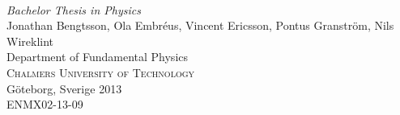 \newcommand{\backgroundpic}[3]{%
    \put(#1,#2){
        \parbox[b][\paperheight]{\paperwidth}{%
    		\centering
			\texttt{[image: \#3]}
			\vfill
}}}

\begin{titlepage}

\AddToShipoutPicture{\backgroundpic{-4}{56.7}{framsida.pdf}}
\mbox{}
\vfill
\addtolength{\voffset}{2cm}

   










\begin{flushleft}

    { \\[0.5 cm]


    \emph{\Large Bachelor Thesis in Physics} \\[0.5 cm]

    

	{\Large Jonathan Bengtsson, Ola Embréus, Vincent Ericsson, Pontus Granström, Nils Wireklint}\\[1 cm]

	

	{\Large Department of Fundamental Physics \\

	\textsc{Chalmers University of Technology} \\

	Göteborg, Sverige 2013 \\

    ENMX02-13-09\\

	} 

	}

\end{flushleft}



\end{titlepage}



\ClearShipoutPicture



\newpage 
